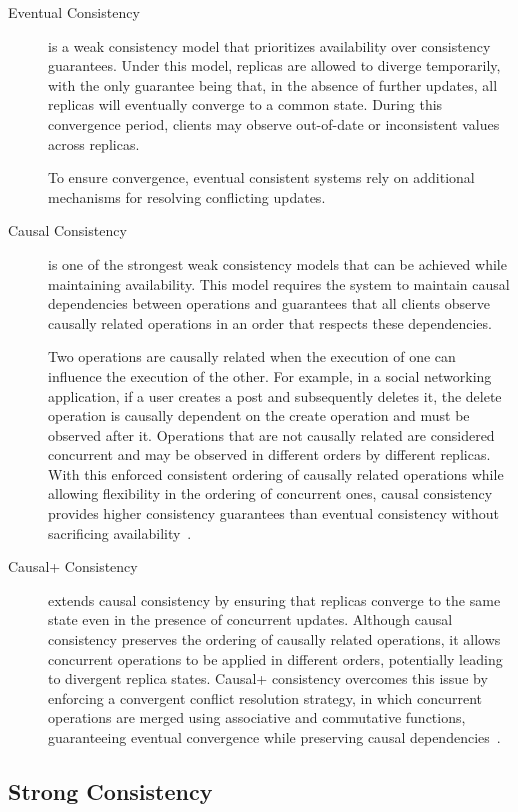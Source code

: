 \begin{description}
    \item[Eventual Consistency] is a weak consistency model that prioritizes availability over consistency guarantees. Under this model, replicas are allowed to diverge temporarily, with the only guarantee being that, in the absence of further updates, all replicas will eventually converge to a common state. During this convergence period, clients may observe out-of-date or inconsistent values across replicas.

          To ensure convergence, eventual consistent systems rely on additional mechanisms for resolving conflicting updates.
    \item[Causal Consistency] is one of the strongest weak consistency models that can be achieved while maintaining availability. This model requires the system to maintain causal dependencies between operations and guarantees that all clients observe causally related operations in an order that respects these dependencies.

          Two operations are causally related when the execution of one can influence the execution of the other. For example, in a social networking application, if a user creates a post and subsequently deletes it, the delete operation is causally dependent on the create operation and must be observed after it. Operations that are not causally related are considered concurrent and may be observed in different orders by different replicas. With this enforced consistent ordering of causally related operations while allowing flexibility in the ordering of concurrent ones, causal consistency provides higher consistency guarantees than eventual consistency without sacrificing availability~\cite{borrego2025convergence}.
    \item[Causal+ Consistency] extends causal consistency by ensuring that replicas converge to the same state even in the presence of concurrent updates. Although causal consistency preserves the ordering of causally related operations, it allows concurrent operations to be applied in different orders, potentially leading to divergent replica states. Causal+ consistency overcomes this issue by enforcing a convergent conflict resolution strategy, in which concurrent operations are merged using associative and commutative functions, guaranteeing eventual convergence while preserving causal dependencies~\cite{shapiro2011comprehensive}.
\end{description}

\subsection{Strong Consistency}
\label{sub:strong}

